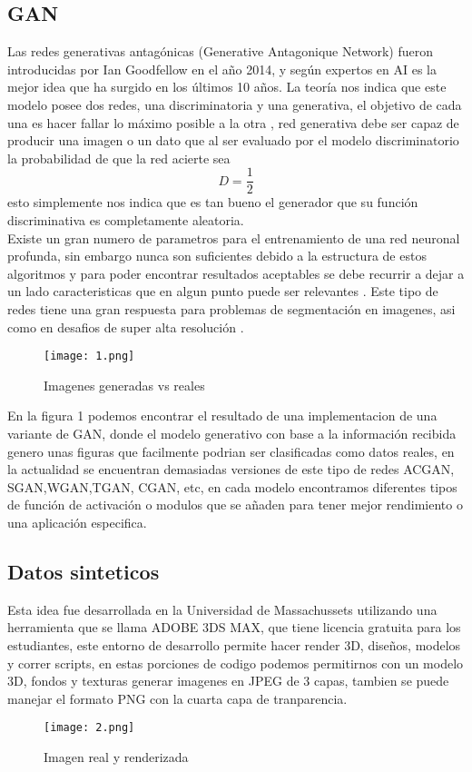 \documentclass[conference]{IEEEtran}
\begin{document}
\subsection{GAN}
Las redes generativas antag\'onicas (Generative Antagonique Network) fueron introducidas por Ian Goodfellow en el año 2014, y seg\'un expertos en AI es la mejor idea que ha surgido en los \'ultimos 10 a\~nos. La teor\'ia nos indica que este modelo posee dos redes, una discriminatoria y una generativa, el objetivo de cada una es hacer fallar lo m\'aximo posible a la otra \cite{b12},  red generativa debe ser capaz de producir una imagen o un dato que al ser evaluado por el modelo discriminatorio la probabilidad de que la red acierte sea \begin{equation}
D=\frac{1}{2}
\end{equation}
esto simplemente nos indica que es tan bueno el generador que su funci\'on discriminativa es completamente aleatoria.\\
Existe un gran numero de parametros para el entrenamiento de una red neuronal profunda, sin embargo nunca son suficientes debido a la estructura de estos algoritmos y para poder encontrar resultados aceptables se debe recurrir a dejar a un lado caracteristicas que en algun punto puede ser relevantes \cite{b13}. Este tipo de redes tiene una gran respuesta para problemas de segmentaci\'on en imagenes, asi como en desafios de super alta resoluci\'on \cite{b12}.
\begin{figure}[H]
	\centering
	\texttt{[image: 1.png]}
	\caption{Imagenes generadas vs reales}
	\label{fig:Resultado GAN}
\end{figure}
 En la figura 1 podemos encontrar el resultado de una implementacion de una variante de GAN, donde el modelo generativo con base a la informaci\'on recibida genero unas figuras que facilmente podrian ser clasificadas como datos reales, en la actualidad se encuentran demasiadas versiones de este tipo de redes ACGAN, SGAN,WGAN,TGAN, CGAN, etc, en cada modelo encontramos diferentes tipos de funci\'on de activaci\'on o modulos que se añaden para tener mejor rendimiento o una aplicaci\'on especifica.
 
 \subsection{Datos sinteticos}
 Esta idea fue desarrollada en la Universidad de Massachussets utilizando una herramienta que se llama ADOBE 3DS MAX, que tiene licencia gratuita para los estudiantes, este entorno de desarrollo permite hacer render 3D, diseños, modelos y correr scripts, en estas porciones de codigo podemos permitirnos con un modelo 3D, fondos y texturas generar imagenes en JPEG de 3 capas, tambien se puede manejar el formato  PNG con la cuarta capa de tranparencia. 
 \begin{figure}[H]
 	\centering
 	\texttt{[image: 2.png]}
 	\caption{Imagen real y renderizada\cite{b15}}
 	\label{fig:Render}
 \end{figure}
  
\end{document}
